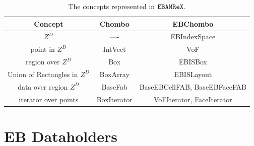 \begin{table}
\begin{center}
\begin{tabular}{|c||c|c|} 
\hline
Concept & Chombo & EBChombo 
\\ \hline\hline
$Z^D$             &  ----   & EBIndexSpace
\\
point in $Z^D$    & IntVect & VoF 
\\
region over $Z^D$ & Box     & EBISBox
\\
Union of Rectangles in $Z^D$ & BoxArray     & EBISLayout
\\
data over region $Z^D$ & BaseFab & BaseEBCellFAB, BaseEBFaceFAB
\\ 
iterator over points & BoxIterator & VoFIterator, FaceIterator
\\ 
\hline                                                 
\end{tabular}
\end{center}
\caption{\label{fig::concepts} The concepts represented in $\tt{EBAMReX}$.}
\end{table}

\section{EB Dataholders}
